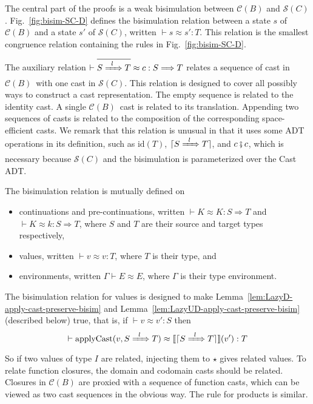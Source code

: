\documentclass[runningheads]{llncs}
\newcommand{\CMachine}[1]{\ensuremath{\mathcal{C}(#1)}}
\newcommand{\CBMachine}[0]{\CMachine{B}}
\newcommand{\SMachine}[1]{\ensuremath{\mathcal{S}(#1)}}
\newcommand{\Tdyn}[0]{\ensuremath{\star}}
\newcommand{\ccast}[3]{#1 \xRightarrow[]{\enskip #2 \enskip} #3}
\newcommand{\denote}[1]{\ensuremath{\llbracket #1 \rrbracket}}
\newcommand{\applyCast}[2]{\ensuremath{\mathrm{applyCast}(#1,#2)}}
\newcommand{\compose}[2]{\ensuremath{#1 \fatsemi #2}}
\newcommand{\translate}[1]{\ensuremath{\lceil#1\rceil}}
\newcommand{\id}[1]{\ensuremath{\mathrm{id}(#1)}}
\newcommand{\valuetyping}[2]{\ensuremath{\vdash #1 : #2}}
\newcommand{\casttyping}[3]{\ensuremath{\vdash #1 : #2 \Longrightarrow #3}}
\newcommand{\bisimE}[3]{\ensuremath{#1 \vdash #2 \approx #3}}
\newcommand{\bisimv}[3]{\valuetyping{#1 \approx #2}{#3}}
\newcommand{\bisimr}[3]{\valuetyping{#1 \approx #2}{#3}}
\newcommand{\bisimc}[4]{\casttyping{#1 \approx #2}{#3}{#4}}
\newcommand{\bisimK}[4]{\casttyping{#1 \approx #2}{#3}{#4}}
\newcommand{\bisims}[3]{\valuetyping{\ensuremath{#1 \approx #2}}{#3}}
\begin{document}


The central part of the proofs is a weak bisimulation between \CMachine{B} and \SMachine{C}.
Fig.~\ref{fig:bisim-SC-D} defines the bisimulation relation
between a state $s$ of \CMachine{B} and a state $s'$
of \SMachine{C}, written $\bisims{s}{s'}{T}$.
This relation is the smallest congruence relation containing the rules 
in Fig.~\ref{fig:bisim-SC-D}.

The auxiliary relation $\bisimc{\overline{\ccast{S}{l}{T}}}{c}{S}{T}$
relates a sequence of cast in \CBMachine\ with one cast in
\SMachine{C}. This relation is designed to cover all possibly ways to
construct a cast representation. The empty sequence is related to the
identity cast. A single \CBMachine\ cast is related to its
translation. Appending two sequences of casts is related to the
composition of the corresponding space-efficient casts.
%
We remark that this relation is unusual in that it uses some ADT
operations in its definition, such as $\id{T}$,
$\translate{\ccast{S}{l}{T}}$, and $\compose{c}{c}$, which is
necessary because \SMachine{C} and the bisimulation is parameterized
over the Cast ADT.

The bisimulation relation is mutually defined on
\begin{itemize}
\item continuations and pre-continuations, written $\bisimK{K}{K}{S}{T}$ and
  $\bisimK{K}{k}{S}{T}$, where $S$ and $T$ are their source and target
  types respectively,
\item values, written $\bisimv{v}{v}{T}$, where $T$ is
  their type, and
\item environments, written $\bisimE{\Gamma}{E}{E}$, where
  $\Gamma$ is their type environment.
\end{itemize}
The bisimulation relation for values is designed to make
Lemma~\ref{lem:LazyD-apply-cast-preserve-bisim} and
Lemma~\ref{lem:LazyUD-apply-cast-preserve-bisim} (described below)
true, that is, if $\bisimv{v}{v'}{S}$ then
\[
\bisimr{
	\applyCast{v}{\ccast{S}{l}{T}}
}{
	\denote{\translate{\ccast{S}{l}{T}}}(v')
}{T}
\]
So if two values of type $I$ are related, injecting them to $\Tdyn$
gives related values.
%
To relate function closures, the domain and codomain casts should be related. 
Closures in \CMachine{B} are proxied with a sequence of function casts, which 
can be viewed as two cast sequences in the obvious way.
%
The rule for products is similar.
\end{document}
